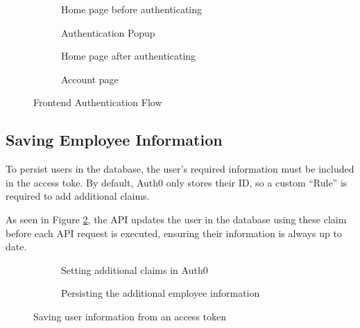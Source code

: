 \begin{figure}[h]
  \centering

  \begin{subfigure}{\subfigwidth}
    \centering
    \caption{Home page before authenticating}
  \end{subfigure}
  \begin{subfigure}{\subfigwidth}
    \centering
    \caption{Authentication Popup}
  \end{subfigure}
  \begin{subfigure}{\subfigwidth}
    \centering
    \caption{Home page after authenticating}
  \end{subfigure}
  \begin{subfigure}{\subfigwidth}
    \centering
    \caption{Account page}
  \end{subfigure}

  \caption{Frontend Authentication Flow}
  \label{fig:authFlow}
\end{figure}

\subsection{Saving Employee Information}

To persist users in the database, the user's required
information must be included in the access toke.
By default, Auth0 only stores their ID, so a custom
\enquote{Rule} is required to add additional claims.

As seen in Figure \ref{fig:userInfo}, the API updates the
user in the database using these claim before each API
request is executed, ensuring their information is always
up to date.

\begin{figure}[h]
  \centering
  \codesize
  \begin{subfigure}{\linewidth}
    
    \caption{Setting additional claims in Auth0}
  \end{subfigure}
  \begin{subfigure}{\linewidth}
    
    \caption{Persisting the additional employee
      information}
  \end{subfigure}

  \caption{Saving user information from an access token}
  \label{fig:userInfo}
\end{figure}
